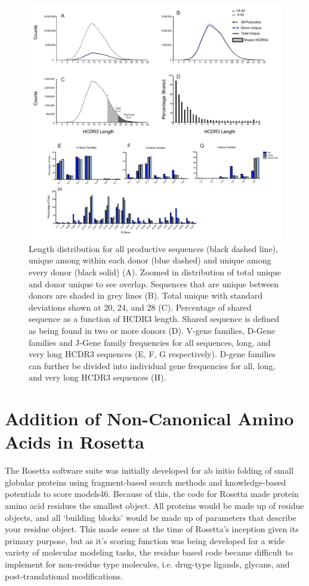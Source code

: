 \begin{figure}
   \centering
   \includegraphics[width=.9\linewidth]{images/chapter3/figure3_7.pdf} %
   \caption[Distribution and VDJ gene Usage]{Length distribution for all productive sequences (black dashed line), unique among within each donor (blue dashed) and unique among every donor (black solid) (A). Zoomed in distribution of total unique and donor unique to see overlap. Sequences that are unique between donors are shaded in grey lines (B). Total unique with standard deviations shown at 20, 24, and 28 (C). Percentage of shared sequence as a function of HCDR3 length. Shared sequence is defined as being found in two or more donors (D). V-gene families, D-Gene families and J-Gene family frequencies for all sequences, long, and very long HCDR3 sequences (E, F, G respectively). D-gene families can further be divided into individual gene frequencies for all, long, and very long HCDR3 sequences (H).}
   \label{fig:figure3_7}
\end{figure}



\section{Addition of Non-Canonical Amino Acids in Rosetta}
The Rosetta software suite was initially developed for ab initio folding of small globular proteins using fragment-based search methods and knowledge-based potentials to score models46. Because of this, the code for Rosetta made protein amino acid residues the smallest object. All proteins would be made up of residue objects, and all ‘building blocks’ would be made up of parameters that describe your residue object. This made sense at the time of Rosetta’s inception given its primary purpose, but as it’s scoring function was being developed for a wide variety of molecular modeling tasks, the residue based code became difficult to implement for non-residue type molecules, i.e. drug-type ligands, glycans, and post-translational modifications.


